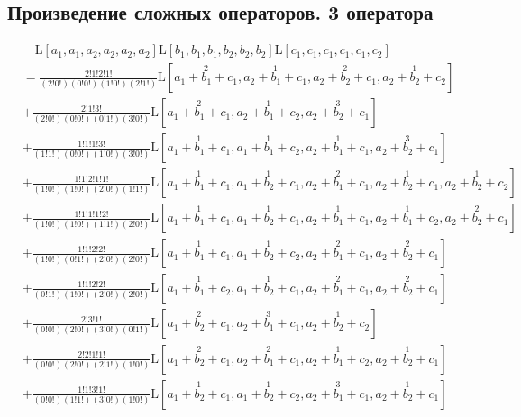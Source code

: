 
\subsection{Произведение сложных операторов. 3 оператора}

\begin{equation*} \begin{aligned}
& \quad
  \mathrm{L}[a_1, a_1, a_2, a_2, a_2, a_2]
  \mathrm{L}[b_1, b_1, b_1, b_2, b_2, b_2]
  \mathrm{L}[c_1, c_1, c_1, c_1, c_1, c_2] \\ &=
  \frac{2!1!2!1!}{(2!0!)(0!0!)(1!0!)(2!1!)}
  \mathrm{L}\left[
  \stackrel{2}{a_1 + b_1 + c_1},
  \stackrel{1}{a_2 + b_1 + c_1},
  \stackrel{2}{a_2 + b_2 + c_1},
  \stackrel{1}{a_2 + b_2 + c_2}
  \right] \\ &
+ \frac{2!1!3!}{(2!0!)(0!0!)(0!1!)(3!0!)}
  \mathrm{L}\left[
  \stackrel{2}{a_1 + b_1 + c_1},
  \stackrel{1}{a_2 + b_1 + c_2},
  \stackrel{3}{a_2 + b_2 + c_1}
  \right] \\ &
+ \frac{1!1!1!3!}{(1!1!)(0!0!)(1!0!)(3!0!)}
  \mathrm{L}\left[
  \stackrel{1}{a_1 + b_1 + c_1},
  \stackrel{1}{a_1 + b_1 + c_2},
  \stackrel{1}{a_2 + b_1 + c_1},
  \stackrel{3}{a_2 + b_2 + c_1}
  \right] \\ &
+ \frac{1!1!2!1!1!}{(1!0!)(1!0!)(2!0!)(1!1!)}
  \mathrm{L}\left[
  \stackrel{1}{a_1 + b_1 + c_1},
  \stackrel{1}{a_1 + b_2 + c_1},
  \stackrel{2}{a_2 + b_1 + c_1},
  \stackrel{1}{a_2 + b_2 + c_1},
  \stackrel{1}{a_2 + b_2 + c_2}
  \right] \\ &
+ \frac{1!1!1!1!2!}{(1!0!)(1!0!)(1!1!)(2!0!)}
  \mathrm{L}\left[
  \stackrel{1}{a_1 + b_1 + c_1},
  \stackrel{1}{a_1 + b_2 + c_1},
  \stackrel{1}{a_2 + b_1 + c_1},
  \stackrel{1}{a_2 + b_1 + c_2},
  \stackrel{2}{a_2 + b_2 + c_1}
  \right] \\ &
+ \frac{1!1!2!2!}{(1!0!)(0!1!)(2!0!)(2!0!)}
  \mathrm{L}\left[
  \stackrel{1}{a_1 + b_1 + c_1},
  \stackrel{1}{a_1 + b_2 + c_2},
  \stackrel{2}{a_2 + b_1 + c_1},
  \stackrel{2}{a_2 + b_2 + c_1}
  \right] \\ &
+ \frac{1!1!2!2!}{(0!1!)(1!0!)(2!0!)(2!0!)}
  \mathrm{L}\left[
  \stackrel{1}{a_1 + b_1 + c_2},
  \stackrel{1}{a_1 + b_2 + c_1},
  \stackrel{2}{a_2 + b_1 + c_1},
  \stackrel{2}{a_2 + b_2 + c_1}
  \right] \\ &
+ \frac{2!3!1!}{(0!0!)(2!0!)(3!0!)(0!1!)}
  \mathrm{L}\left[
  \stackrel{2}{a_1 + b_2 + c_1},
  \stackrel{3}{a_2 + b_1 + c_1},
  \stackrel{1}{a_2 + b_2 + c_2}
  \right] \\ &
+ \frac{2!2!1!1!}{(0!0!)(2!0!)(2!1!)(1!0!)}
  \mathrm{L}\left[
  \stackrel{2}{a_1 + b_2 + c_1},
  \stackrel{2}{a_2 + b_1 + c_1},
  \stackrel{1}{a_2 + b_1 + c_2},
  \stackrel{1}{a_2 + b_2 + c_1}
  \right] \\ &
+ \frac{1!1!3!1!}{(0!0!)(1!1!)(3!0!)(1!0!)}
  \mathrm{L}\left[
  \stackrel{1}{a_1 + b_2 + c_1},
  \stackrel{1}{a_1 + b_2 + c_2},
  \stackrel{3}{a_2 + b_1 + c_1},
  \stackrel{1}{a_2 + b_2 + c_1}
  \right] \\
\end{aligned} \end{equation*}

